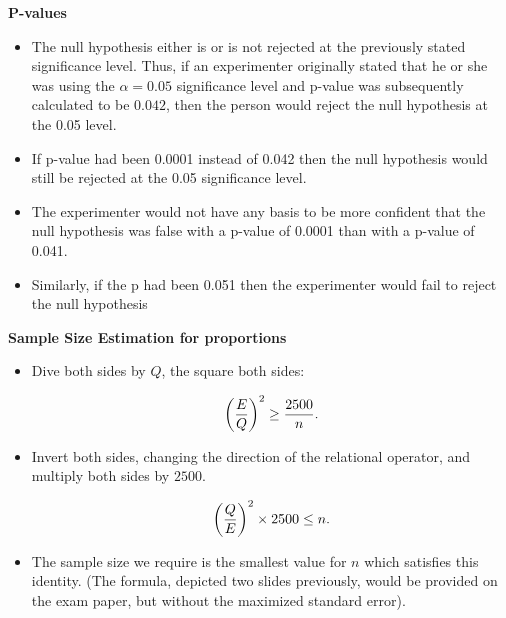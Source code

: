 \textbf{P-values}

\begin{itemize}
\item The null hypothesis either is or is not rejected at the previously stated significance level. Thus, if an experimenter originally stated that he or she was using the $\alpha = 0.05$ significance level and p-value was subsequently calculated to be $0.042$, then the person would reject the null hypothesis at the 0.05 level. \item If p-value had been 0.0001 instead of 0.042 then the null hypothesis would still be rejected at the 0.05 significance level.  \item
The experimenter would not have any basis to be more confident that the null hypothesis was false with a p-value of 0.0001 than with a p-value of 0.041. \item Similarly, if the p had been 0.051 then the experimenter would fail to reject the null hypothesis
\end{itemize}












\textbf{Sample Size Estimation for proportions}

\begin{itemize}

\item Dive both sides by $Q$, the square both sides:

\[ \left({E\over Q}\right)^2 \geq {2500 \over n}. \]

\item Invert both sides, changing the direction of the relational operator, and multiply both sides by $2500$.

\[ \left({Q\over E}\right)^2 \times 2500 \leq n. \]

\item The sample size we require is the smallest value for $n$ which satisfies this identity. (The formula,  depicted two slides previously, would be provided on the exam paper, but without the maximized standard error).
\end{itemize}




